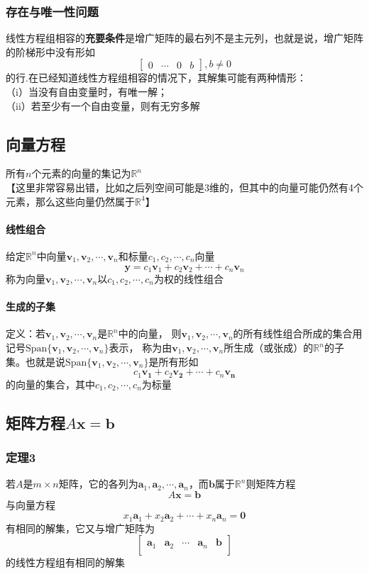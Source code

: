 \documentclass{article}
\newcommand{\ve}{\boldsymbol}
\newcommand{\spans}{\text{Span}}
\begin{document}
\begin{CJK}{UTF8}{gkai}
\subsubsection{存在与唯一性问题}
线性方程组相容的\textbf{充要条件}是增广矩阵的最右列不是主元列，也就是说，增广矩阵的阶梯形中没有形如
\[\begin{bmatrix}
    0&\cdots&0&b
\end{bmatrix},b\neq0\]
的行.在已经知道线性方程组相容的情况下，其解集可能有两种情形：\\
（i）当没有自由变量时，有唯一解；\\
（ii）若至少有一个自由变量，则有无穷多解\\
\subsection{向量方程}
所有$n$个元素的向量的集记为$\mathbb{R}^n$\\
【这里非常容易出错，比如之后列空间可能是3维的，但其中的向量可能仍然有4个元素，那么这些向量仍然属于$\mathbb{R}^4$】\\
\paragraph{线性组合\\}
给定$\mathbb{R}^n$中向量$\ve{v}_1,\ve{v}_2,\cdots,\ve{v}_n$和标量$c_1,c_2,\cdots,c_n$向量\\
\[\ve{y}=c_1\ve{v}_1+c_2\ve{v}_2+\cdots+c_n\ve{v}_n\]
称为向量$\ve{v}_1,\ve{v}_2,\cdots,\ve{v}_n$以$c_1,c_2,\cdots,c_n$为权的线性组合
\paragraph{生成的子集\\}
定义：若$\ve{v}_1,\ve{v}_2,\cdots,\ve{v}_n$是$\mathbb{R}^n$中的向量，
则$\ve{v}_1,\ve{v}_2,\cdots,\ve{v}_n$的所有线性组合所成的集合用记号$\spans \{\ve{v}_1,\ve{v}_2,\cdots,\ve{v}_n\}$表示，
称为由$\ve{v}_1,\ve{v}_2,\cdots,\ve{v}_n$所生成（或张成）的$\mathbb{R}^n$的子集。也就是说$\spans\{\ve{v}_1,\ve{v}_2,\cdots,\ve{v}_n\}$是所有形如\\
\[c_1\ve{v_1}+c_2\ve{v_2}+\cdots+c_n\ve{v_n}\]
的向量的集合，其中$c_1,c_2,\cdots,c_n$为标量\\

\subsection{矩阵方程$A\ve{x}=\ve{b}$}
\subsubsection{定理3}
若$A$是$m\times n$矩阵，它的各列为$\ve{a}_1,\ve{a}_2,\cdots,\ve{a}_n$，而$\ve{b}$属于$\mathbb{R}^n$则矩阵方程
\[A\ve{x}=\ve{b}\]
与向量方程
\[x_1\ve{a}_1+x_2\ve{a}_2+\cdots+x_n\ve{a}_n=\ve{0}\]
有相同的解集，它又与增广矩阵为
\[
\begin{bmatrix}
\ve{a}_1&\ve{a}_2&\cdots&\ve{a}_n&\ve{b}\\
\end{bmatrix}
\]
的线性方程组有相同的解集\\

\end{CJK}
\end{document}
